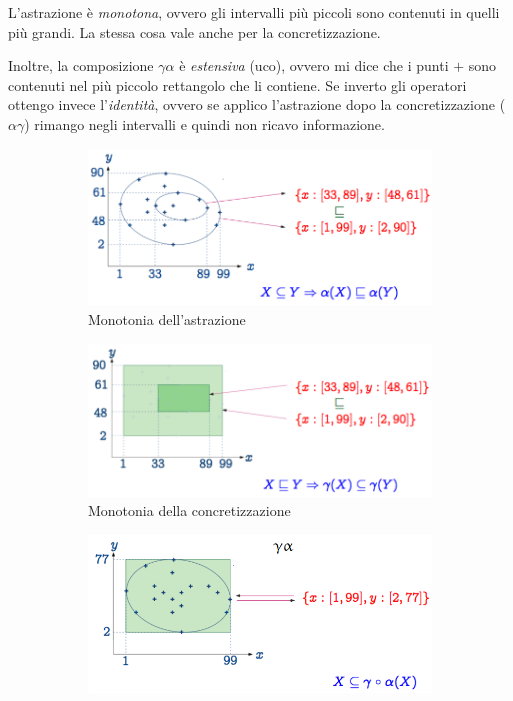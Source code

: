 \documentclass[a4paper,oneside,titlepage]{book}
\begin{document}
\noindent
L'astrazione è \textit{monotona}, ovvero gli intervalli più piccoli sono contenuti in quelli più grandi. La stessa cosa vale anche per la concretizzazione.

Inoltre, la composizione $\gamma \alpha$ è \textit{estensiva} (uco), ovvero mi dice che i punti $+$ sono contenuti nel più piccolo rettangolo che li contiene. Se inverto gli operatori ottengo invece l'\textit{identità}, ovvero se applico l’astrazione dopo la concretizzazione ($\alpha \gamma$) rimango negli intervalli e quindi non ricavo informazione.
\begin{figure}[htp]
    \begin{subfigure}{0.49\textwidth}
        \centering
		\includegraphics[width=\textwidth, height=\textheight, keepaspectratio]{esMonAstr.png}
		\caption{Monotonia dell'astrazione}
	\end{subfigure}
	\hfill
	\begin{subfigure}{0.49\textwidth}
	    \centering
		\includegraphics[width=\textwidth, height=\textheight, keepaspectratio]{esMonConcr.png} 
		\caption{Monotonia della concretizzazione}
	\end{subfigure}
	\begin{subfigure}{0.49\textwidth}
	    \centering
		\includegraphics[width=\textwidth, height=\textheight, keepaspectratio]{esEst.png}

\end{subfigure}
\end{figure}
\end{document}
